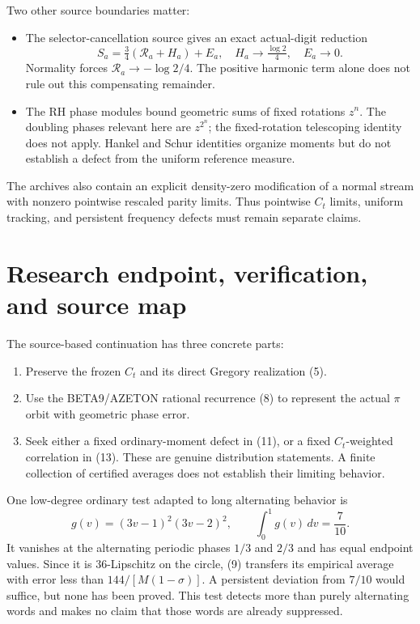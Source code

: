 \documentclass[10pt,a4paper]{article}
\begin{document}
Two other source boundaries matter:
\begin{itemize}
\item The selector-cancellation source gives an exact actual-digit reduction
\[
 S_a=\tfrac34(\mathcal R_a+H_a)+E_a,
 \quad H_a\to\tfrac{\log2}{4},\quad E_a\to0.
\]
Normality forces $\mathcal R_a\to-\log2/4$. The positive harmonic term alone does not rule out this compensating remainder.
\item The RH phase modules bound geometric sums of fixed rotations $z^n$. The doubling phases relevant here are $z^{2^n}$; the fixed-rotation telescoping identity does not apply. Hankel and Schur identities organize moments but do not establish a defect from the uniform reference measure.
\end{itemize}
The archives also contain an explicit density-zero modification of a normal stream with nonzero pointwise rescaled parity limits. Thus pointwise $C_t$ limits, uniform tracking, and persistent frequency defects must remain separate claims.

\newpage
\section{Research endpoint, verification, and source map}
The source-based continuation has three concrete parts:
\begin{enumerate}
\item Preserve the frozen $C_t$ and its direct Gregory realization (5).
\item Use the BETA9/AZETON rational recurrence (8) to represent the actual $\pi$ orbit with geometric phase error.
\item Seek either a fixed ordinary-moment defect in (11), or a fixed $C_t$-weighted correlation in (13). These are genuine distribution statements. A finite collection of certified averages does not establish their limiting behavior.
\end{enumerate}
One low-degree ordinary test adapted to long alternating behavior is
\[
 g(v)=(3v-1)^2(3v-2)^2,
 \qquad\int_0^1g(v)\,dv=\frac7{10}.
\]
It vanishes at the alternating periodic phases $1/3$ and $2/3$ and has equal endpoint values. Since it is $36$-Lipschitz on the circle, (9) transfers its empirical average with error less than $144/[M(1-\sigma)]$. A persistent deviation from $7/10$ would suffice, but none has been proved. This test detects more than purely alternating words and makes no claim that those words are already suppressed.
\end{document}
